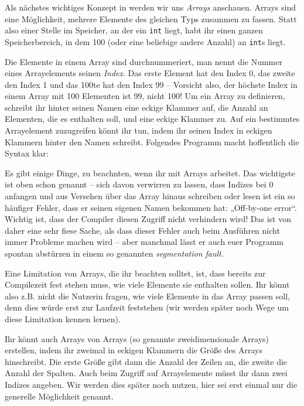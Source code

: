 
Als nächstes wichtiges Konzept in \Cpp werden wir uns \emph{Arrays} anschauen.
Arrays sind eine Möglichkeit, mehrere Elemente des gleichen Typs zusammen zu
fassen. Statt also einer Stelle im Speicher, an der ein \texttt{int} liegt,
habt ihr einen ganzen Speicherbereich, in dem 100 (oder eine beliebige andere
Anzahl) an \texttt{int}s liegt.

Die Elemente in einem Array sind durchnummeriert, man nennt die Nummer eines
Arrayelements seinen \emph{Index}. Das erste Element hat den Index 0, das
zweite den Index 1 und das 100te hat den Index 99 -- Vorsicht also, der höchste
Index in einem Array mit 100 Elementen ist 99, nicht 100! Um ein Array zu
definieren, schreibt ihr hinter seinen Namen eine eckige Klammer auf, die
Anzahl an Elementen, die es enthalten soll, und eine eckige Klammer zu. Auf ein
bestimmtes Arrayelement zuzugreifen könnt ihr tun, indem ihr seinen Index in
eckigen Klammern hinter den Namen schreibt. Folgendes Programm macht
hoffentlich die Syntax klar:

Es gibt einige Dinge, zu beachnten, wenn ihr mit Arrays arbeitet. Das
wichtigste ist oben schon genannt -- sich davon verwirren zu lassen, dass
Indizes bei 0 anfangen und aus Versehen über das Array hinaus schreiben oder
lesen ist ein so häufiger Fehler, dass er seinen eigenen Namen bekommen hat:
„Off-by-one error“. Wichtig ist, dass der Compiler diesen Zugriff nicht
verhindern wird! Das ist von daher eine sehr fiese Sache, als dass dieser
Fehler auch beim Ausführen nicht immer Probleme machen wird -- aber manchmal
lässt er auch euer Programm spontan abstürzen in einem so genannten
\emph{segmentation fault}.

Eine Limitation von Arrays, die ihr beachten solltet, ist, dass bereits zur
Compilezeit fest stehen muss, wie viele Elemente sie enthalten sollen. Ihr
könnt also z.B. nicht die Nutzerin fragen, wie viele Elemente in das Array
passen soll, denn dies würde erst zur Laufzeit feststehen (wir werden später
noch Wege um diese Limitation kennen lernen).

Ihr könnt auch Arrays von Arrays (so genannte zweidimensionale Arrays)
erstellen, indem ihr zweimal in eckigen Klammern die Größe des Arrays
hinschreibt. Die erste Größe gibt dann die Anzahl der Zeilen an, die zweite die
Anzahl der Spalten. Auch beim Zugriff auf Arrayelemente müsst ihr dann zwei
Indizes angeben. Wir werden dies später noch nutzen, hier sei erst einmal nur
die generelle Möglichkeit genannt.

